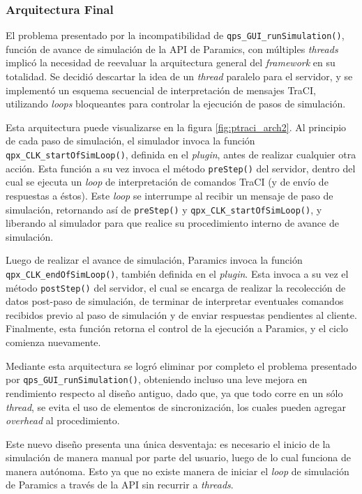 \subsubsection{Arquitectura Final} \label{sec:architecture:final}

El problema presentado por la incompatibilidad de \texttt{qps\_GUI\_runSimulation()}, función de avance de simulación de la API de Paramics, con múltiples \emph{threads} implicó la necesidad de reevaluar la arquitectura general del \emph{framework} en su totalidad. Se decidió descartar la idea de un \emph{thread} paralelo para el servidor, y se implementó un esquema secuencial de interpretación de mensajes TraCI, utilizando \emph{loops} bloqueantes para controlar la ejecución de pasos de simulación.

Esta arquitectura puede visualizarse en la figura \ref{fig:ptraci_arch2}. Al principio de cada paso de simulación, el simulador invoca la función \texttt{qpx\_CLK\_startOfSimLoop()}, definida en el \emph{plugin}, antes de realizar cualquier otra acción. Esta función a su vez invoca el método \texttt{preStep()} del servidor, dentro del cual se ejecuta un \emph{loop} de interpretación de comandos TraCI (y de envío de respuestas a éstos). Este \emph{loop} se interrumpe al recibir un mensaje de paso de simulación, retornando así de \texttt{preStep()} y \texttt{qpx\_CLK\_startOfSimLoop()}, y liberando al simulador para que realice su procedimiento interno de avance de simulación. 

Luego de realizar el avance de simulación, Paramics invoca la función \texttt{qpx\_CLK\_endOfSimLoop()}, también definida en el \emph{plugin}. Esta invoca a su vez el método \texttt{postStep()} del servidor, el cual se encarga de realizar la recolección de datos post-paso de simulación, de terminar de interpretar eventuales comandos recibidos previo al paso de simulación y de enviar respuestas pendientes al cliente. Finalmente, esta función retorna el control de la ejecución a Paramics, y el ciclo comienza nuevamente.

Mediante esta arquitectura se logró eliminar por completo el problema presentado por \texttt{qps\_GUI\_runSimulation()}, obteniendo incluso una leve mejora en rendimiento respecto al diseño antiguo, dado que, ya que todo corre en un sólo \emph{thread}, se evita el uso de elementos de sincronización, los cuales pueden agregar \emph{overhead} al procedimiento.

Este nuevo diseño presenta una única desventaja: es necesario el inicio de la simulación de manera manual por parte del usuario, luego de lo cual funciona de manera autónoma. Esto ya que no existe manera de iniciar el \emph{loop} de simulación de Paramics a través de la API sin recurrir a \emph{threads}.

